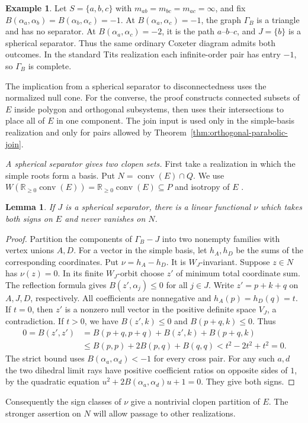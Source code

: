 \documentclass[11pt,reqno]{amsart}
\theoremstyle{plain}
\newtheorem{lemma}[theorem]{Lemma}
\theoremstyle{definition}
\newtheorem{example}[theorem]{Example}
\theoremstyle{remark}
\numberwithin{equation}{section}
\begin{document}
\begin{example}\label{p14:label-example}
Let $S=\{a,b,c\}$ with $m_{ab}=m_{bc}=m_{ac}=\infty$, and fix
$B(\alpha_a,\alpha_b)=B(\alpha_b,\alpha_c)=-1$.
At $B(\alpha_a,\alpha_c)=-1$, the graph $\Gamma_B$ is a triangle
and has no separator. At $B(\alpha_a,\alpha_c)=-2$, it is the
path $a$--$b$--$c$, and $J=\{b\}$ is a spherical separator.
Thus the same ordinary Coxeter diagram admits both outcomes.
In the standard Tits realization each infinite-order pair has
entry $-1$, so $\Gamma_B$ is complete.
\end{example}

The implication from a spherical separator to disconnectedness uses
the normalized null cone. For the converse, the proof constructs
connected subsets of $E$ inside polygon and orthogonal subsystems,
then uses their intersections to place all of $E$ in one component.
The join input is used only in the simple-basis realization and
only for pairs allowed by Theorem~\ref{thm:orthogonal-parabolic-join}.

\par\medskip
\noindent\emph{A spherical separator gives two clopen sets.}
First take a realization in which the simple roots form a basis. Put $N=\operatorname{conv}(E)\cap Q$. We use $W(\mathbb R_{\ge0}\operatorname{conv}(E))=\mathbb R_{\ge0}\operatorname{conv}(E)\subseteq P$ and isotropy of $E$ \cite{DHR,HLR}.
\begin{lemma}\label{p14:sep}
If $J$ is a spherical separator, there is a linear functional $\nu$ which takes both signs on $E$ and never vanishes on $N$.
\end{lemma}
\begin{proof}
Partition the components of $\Gamma_B-J$ into two nonempty families with vertex unions $A,D$. For a vector in the simple basis, let $h_A,h_D$ be the sums of the corresponding coordinates. Put $\nu=h_A-h_D$. It is $W_J$-invariant. Suppose $z\in N$ has $\nu(z)=0$. In its finite $W_J$-orbit choose $z'$ of minimum total coordinate sum. The reflection formula gives $B(z',\alpha_j)\le0$ for all $j\in J$. Write $z'=p+k+q$ on $A,J,D$, respectively. All coefficients are nonnegative and $h_A(p)=h_D(q)=t$. If $t=0$, then $z'$ is a nonzero null vector in the positive definite space $V_J$, a contradiction. If $t>0$, we have $B(z',k)\le0$ and $B(p+q,k)\le0$. Thus
\begin{align*}
 0=B(z',z')&=B(p+q,p+q)+B(z',k)+B(p+q,k)\\
 &\le B(p,p)+2B(p,q)+B(q,q)<t^2-2t^2+t^2=0 .
\end{align*}
The strict bound uses $B(\alpha_a,\alpha_d)<-1$ for every cross pair. For any such $a,d$ the two dihedral limit rays have positive coefficient ratios on opposite sides of $1$, by the quadratic equation $u^2+2B(\alpha_a,\alpha_d)u+1=0$. They give both signs.
\end{proof}
Consequently the sign classes of $\nu$ give a nontrivial clopen partition of $E$. The stronger assertion on $N$ will allow passage to other realizations.
\end{document}
